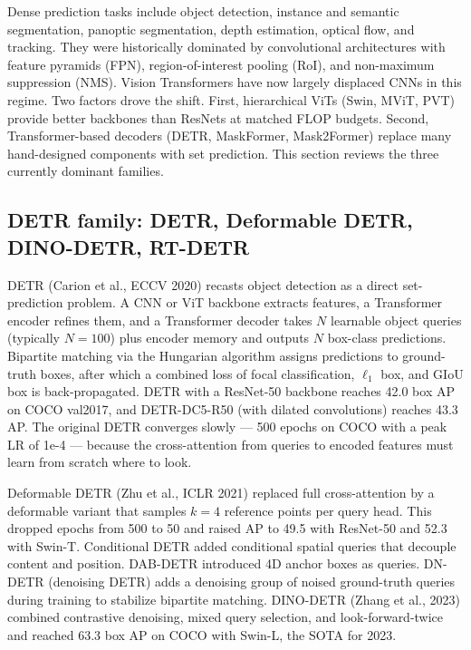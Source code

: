Dense prediction tasks include object detection, instance and semantic segmentation, panoptic segmentation, depth estimation, optical flow, and tracking. They were historically dominated by convolutional architectures with feature pyramids (FPN), region-of-interest pooling (RoI), and non-maximum suppression (NMS). Vision Transformers have now largely displaced CNNs in this regime. Two factors drove the shift. First, hierarchical ViTs (Swin, MViT, PVT) provide better backbones than ResNets at matched FLOP budgets. Second, Transformer-based decoders (DETR, MaskFormer, Mask2Former) replace many hand-designed components with set prediction. This section reviews the three currently dominant families.

\subsection{DETR family: DETR, Deformable DETR, DINO-DETR, RT-DETR}\label{detr-family-detr-deformable-detr-dino-detr-rt-detr}

DETR (Carion et al., ECCV 2020) recasts object detection as a direct set-prediction problem. A CNN or ViT backbone extracts features, a Transformer encoder refines them, and a Transformer decoder takes \(N\) learnable object queries (typically \(N=100\)) plus encoder memory and outputs \(N\) box-class predictions. Bipartite matching via the Hungarian algorithm assigns predictions to ground-truth boxes, after which a combined loss of focal classification, \(\ell_1\) box, and GIoU box is back-propagated. DETR with a ResNet-50 backbone reaches 42.0 box AP on COCO val2017, and DETR-DC5-R50 (with dilated convolutions) reaches 43.3 AP. The original DETR converges slowly --- 500 epochs on COCO with a peak LR of 1e-4 --- because the cross-attention from queries to encoded features must learn from scratch where to look.

Deformable DETR (Zhu et al., ICLR 2021) replaced full cross-attention by a deformable variant that samples \(k=4\) reference points per query head. This dropped epochs from 500 to 50 and raised AP to 49.5 with ResNet-50 and 52.3 with Swin-T. Conditional DETR added conditional spatial queries that decouple content and position. DAB-DETR introduced 4D anchor boxes as queries. DN-DETR (denoising DETR) adds a denoising group of noised ground-truth queries during training to stabilize bipartite matching. DINO-DETR (Zhang et al., 2023) combined contrastive denoising, mixed query selection, and look-forward-twice and reached 63.3 box AP on COCO with Swin-L, the SOTA for 2023.

